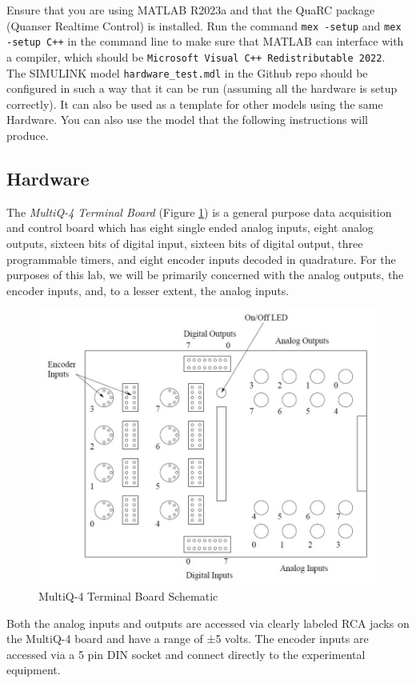 \documentclass[11pt,letterpaper]{article}
\begin{document}
Ensure that you are using MATLAB R2023a and that the QuaRC package (Quanser Realtime Control) is installed. Run the command \texttt{mex -setup} and \texttt{mex -setup C++} in the command line to make sure that MATLAB can interface with a compiler, which should be \texttt{Microsoft Visual C++ Redistributable 2022}. \\

The SIMULINK model \texttt{hardware\_test.mdl} in the Github repo should be configured in such a way that it can be run (assuming all the hardware is setup correctly). It can also be used as a template for other models using the same Hardware. You can also use the model that the following instructions will produce. 

\newpage
\subsection{Hardware}\label{subsec:hardware}
The \textit{MultiQ-4 Terminal Board} (Figure \ref{fig:q4_DAQ}) is a general purpose data acquisition and control board which has eight single ended analog inputs, eight analog outputs, sixteen bits of digital input, sixteen bits of digital output, three programmable timers, and eight encoder inputs decoded in quadrature. For the purposes of this lab, we will be primarily concerned with the analog outputs, the encoder inputs, and, to a lesser extent, the analog inputs.
\begin{figure}[H]
  \centering 
  \includegraphics[width=1\textwidth]{Figures/q4_daq.png}
  \caption{MultiQ-4 Terminal Board Schematic}
  \label{fig:q4_DAQ}
\end{figure}
\noindent Both the analog inputs and outputs are accessed via clearly labeled RCA jacks on the MultiQ-4 board and have a range of ±5 volts. The encoder inputs are accessed via a 5 pin DIN socket and connect directly to the experimental equipment.
\end{document}
